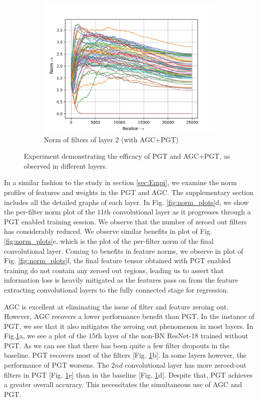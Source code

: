 \documentclass[times,sort&compress]{elsarticle}
\begin{document}
\begin{figure}[t]
\begin{subfigure}[t]{0.32\textwidth}
\includegraphics[width=\linewidth]{agc_pgt-w-layer-1-2}
\caption{Norm of filters of layer 2 (with AGC+PGT)}
\end{subfigure}
\captionsetup{font=normalsize}
\caption{ Experiment demonstrating the efficacy of PGT and AGC+PGT, as observed in
different layers. }
\label{fig:agc_pgt}
\end{figure}





In a similar fashion to the study in section \ref{sec:Empi}, we examine the norm
profiles of features and weights in the PGT and AGC. The supplementary section includes
all the detailed graphs of each layer. In Fig. \ref{fig:norm_plots}d, we show the
per-filter norm plot of the $11\textit{th}$ convolutional layer as it progresses through
a PGT enabled training session. We observe that the number of zeroed out filters has
considerably reduced. We observe similar benefits in plot of Fig. \ref{fig:norm_plots}e,
which is the plot of the per-filter norm of the final convolutional layer. Coming to
benefits in feature norms, we observe in plot of Fig. \ref{fig:norm_plots}f, the final
feature tensor obtained with PGT enabled training do not contain any zeroed out regions,
leading us to assert that information loss is heavily mitigated as the features pass on
from the feature extracting convolutional layers to the fully connected stage for
regression.

AGC is excellent at eliminating the issue of filter and feature zeroing out. However,
AGC recovers a lower performance benefit than PGT. In the instance of PGT, we see that
it also mitigates the zeroing out phenomenon in most layers. In Fig.\ref{fig:agc_pgt}a,
we see a plot of the $15\textit{th}$ layer of the non-BN ResNet-18 trained without PGT.
As we can see that there has been quite a few filter dropouts in the baseline. PGT
recovers most of the filters [Fig. \ref{fig:agc_pgt}b]. In some layers however, the
performance of PGT worsens. The $2\textit{nd}$ convolutional layer has more zeroed-out
filters in PGT [Fig. \ref{fig:agc_pgt}e] than in the baseline [Fig. \ref{fig:agc_pgt}d].
Despite that, PGT achieves a greater overall accuracy. This necessitates the
simultaneous use of AGC and PGT.
\end{document}
